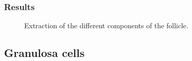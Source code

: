 \subsubsection{Results}
\begin{figure}[htbp]
\centering
 
 \hfill
 \hfill

 \caption{Extraction of the different components of the follicle.}
 \label{fig:segfollicle:matlab:vascularization}
\end{figure}

\subsection{Granulosa cells}
